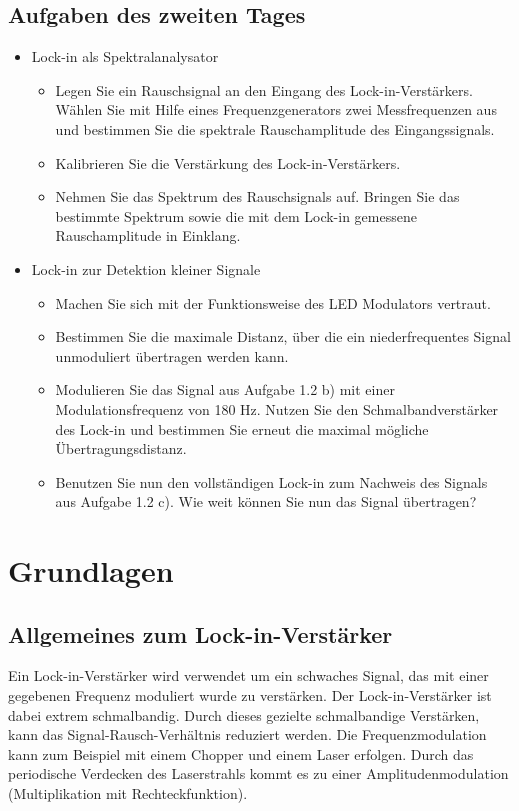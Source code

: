 \documentclass{scrartcl}						%
\begin{document}
\subsection{Aufgaben des zweiten Tages}
	\begin{itemize}
		\item Lock-in als Spektralanalysator
		\begin{itemize}
			\item Legen Sie ein Rauschsignal an den Eingang des Lock-in-Verstärkers. Wählen Sie
			mit Hilfe eines Frequenzgenerators zwei Messfrequenzen aus und bestimmen Sie
			die spektrale Rauschamplitude des Eingangssignals.
			\item Kalibrieren Sie die Verstärkung des Lock-in-Verstärkers.
			\item Nehmen Sie das Spektrum des Rauschsignals auf. Bringen Sie das bestimmte
			Spektrum sowie die mit dem Lock-in gemessene Rauschamplitude in Einklang.
		\end{itemize}
		\item Lock-in zur Detektion kleiner Signale
		\begin{itemize}
			\item Machen Sie sich mit der Funktionsweise des LED Modulators vertraut.
			\item Bestimmen Sie die maximale Distanz, über die ein niederfrequentes Signal
			unmoduliert übertragen werden kann.
			\item Modulieren Sie das Signal aus Aufgabe 1.2 b) mit einer Modulationsfrequenz von
			180 Hz. Nutzen Sie den Schmalbandverstärker des Lock-in und bestimmen Sie
			erneut die maximal mögliche Übertragungsdistanz.
			\item Benutzen Sie nun den vollständigen Lock-in zum Nachweis des Signals aus
			Aufgabe 1.2 c). Wie weit können Sie nun das Signal übertragen?
		\end{itemize}
	\end{itemize}
	
\clearpage

\section{Grundlagen}
	
	\subsection{Allgemeines zum Lock-in-Verstärker}
	Ein Lock-in-Verstärker wird verwendet um ein schwaches Signal, das mit einer gegebenen Frequenz moduliert wurde zu verstärken. Der Lock-in-Verstärker ist dabei extrem schmalbandig. Durch dieses gezielte schmalbandige Verstärken, kann das Signal-Rausch-Verhältnis reduziert werden. Die Frequenzmodulation kann zum Beispiel mit einem Chopper und einem Laser erfolgen. Durch das periodische Verdecken des Laserstrahls kommt es zu einer Amplitudenmodulation (Multiplikation mit Rechteckfunktion). 
	
\end{document}
